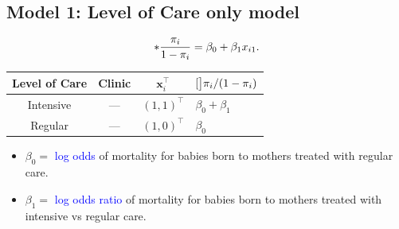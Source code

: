 \documentclass[oneside]{book}\usepackage[]{graphicx}\usepackage[svgnames]{xcolor}
\let\log\relax%
\providecommand{\Vector}[1]{\bm{#1}}%
\begin{document}
\subsection*{Model 1: Level of Care only model}
\[ \log*{\frac{\pi_i}{1-\pi_i}}=\beta_0+\beta_1x_{i1}. \]
\begin{table}[!htbp]
      \centering
      \begin{tabular}{cccl}
            Level of Care & Clinic & $ \Vector{x}_i^\top $ & $ \log[\big]{\pi_i/(1-\pi_i)} $ \\
            \midrule
            Intensive     & ---    & $ (1,1)^\top $        & $ \beta_0+\beta_1 $             \\
            Regular       & ---    & $ (1,0)^\top $        & $ \beta_0 $                     \\
            \bottomrule
      \end{tabular}
\end{table}
\begin{itemize}
      \item $ \beta_0= $ \textcolor{Blue}{log odds} of mortality for babies born to mothers treated with regular care.
      \item $ \beta_1= $ \textcolor{Blue}{log odds ratio} of mortality for babies born to mothers treated
            with intensive vs regular care.
\end{itemize}
\end{document}
